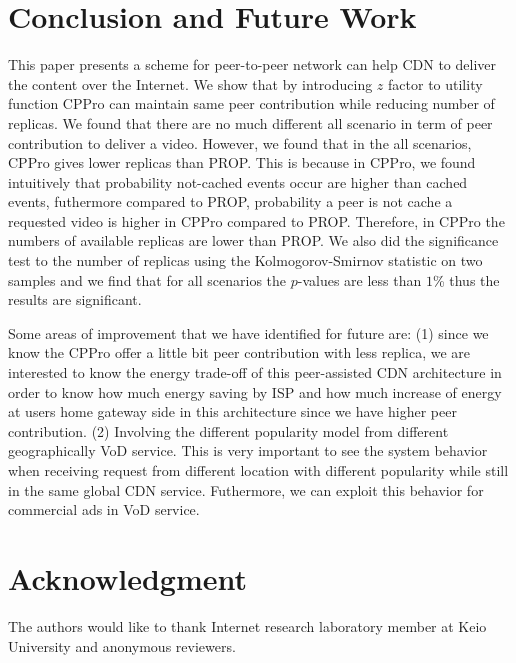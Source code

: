 \documentclass[10pt,final,journal,a4paper]{IEEEtran}
\begin{document}
\section{Conclusion and Future Work}\label{conclusion}
This paper presents a scheme for peer-to-peer network can help CDN to deliver the content over the Internet. 
We show that by introducing $z$ factor to utility function CPPro can maintain same peer contribution while reducing number of replicas.
We found that there are no much different all scenario in term of peer contribution to deliver a video. 
However, we found that in the all scenarios, CPPro gives lower replicas than PROP. 
This is because in CPPro, we found intuitively that probability not-cached events occur are higher than cached events, futhermore compared to PROP, probability a peer is not cache a requested video is higher in CPPro compared to PROP.
Therefore, in CPPro the numbers of available replicas are lower than PROP. 
We also did the significance test to the number of replicas using the Kolmogorov-Smirnov statistic on two samples and we find that for all scenarios the $p$-values are less than $1$\% thus the results are significant. 

Some areas of improvement that we have identified for future are: (1) since we know the CPPro offer a little bit peer contribution with less replica, we are interested to know the energy trade-off of this peer-assisted CDN architecture in order to know how much energy saving by ISP and how much increase of energy at users home gateway side in this architecture since we have higher peer contribution.   
(2) Involving the different popularity model from different geographically VoD service.
This is very important to see the system behavior when receiving request from different location with different popularity while still in the same global CDN service. 
Futhermore, we can exploit this behavior for commercial ads in VoD service.


\section*{Acknowledgment}
The authors would like to thank Internet research laboratory member at Keio University and anonymous reviewers.





\end{document}
